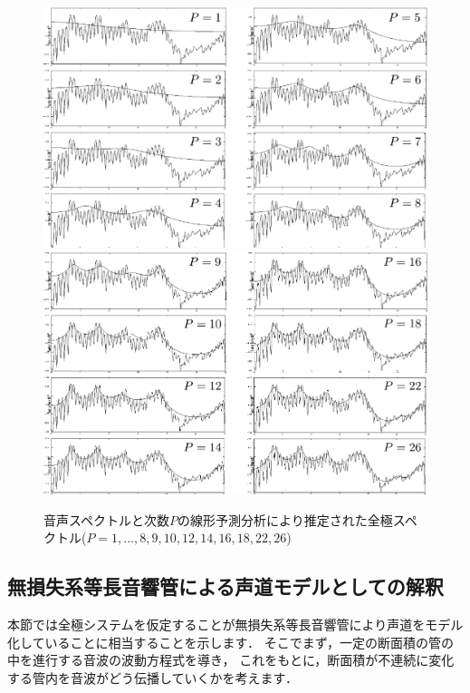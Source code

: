 \begin{figure}[t!]
\centering
\includegraphics[width=.98\linewidth,keepaspectratio=true]{sections/speech/AllPoleFitting1.eps}
\includegraphics[width=.98\linewidth,keepaspectratio=true]{sections/speech/AllPoleFitting2.eps}
\vspace{0ex}
 \caption{音声スペクトルと次数$P$の線形予測分析により推定された全極スペクトル($P=1,\ldots,8,9,10,12,14,16,18,22,26$)}
\label{fig:AllPoleFitting}
\vspace{0ex}
\end{figure}

\subsection{無損失系等長音響管による声道モデルとしての解釈}
\label{subsec:acoustic_cube_model}

本節では全極システムを仮定することが無損失系等長音響管により声道をモデル化していることに相当することを示します．
そこでまず，一定の断面積の管の中を進行する音波の波動方程式を導き，
これをもとに，断面積が不連続に変化する管内を音波がどう伝播していくかを考えます．

